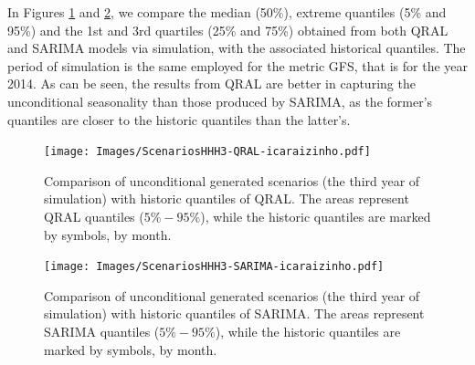 In Figures \ref{fig:scenarios-qral} and \ref{fig:scenarios-sarima}, we compare the median (50\%), extreme quantiles (5\% and 95\%) and the 1st and 3rd quartiles (25\% and 75\%) obtained from  both QRAL and SARIMA models via simulation, with the associated historical quantiles. The period of simulation is the same employed for the metric GFS, that is for the year 2014. As can be seen, the results from QRAL are better in capturing the unconditional seasonality than those produced by SARIMA, as the former's quantiles are closer to the historic quantiles than the latter's.


\begin{figure}[ht]
	\centering
	\texttt{[image: Images/ScenariosHHH3-QRAL-icaraizinho.pdf]}
	\caption{Comparison of unconditional generated scenarios (the third year of simulation) with historic quantiles of QRAL.  The areas represent QRAL quantiles ($5\%-95\%$),
	while the historic quantiles are marked by symbols, by month. }
	\label{fig:scenarios-qral}
\end{figure}

\begin{figure}[h]
	\centering
	\texttt{[image: Images/ScenariosHHH3-SARIMA-icaraizinho.pdf]}
	\caption{Comparison of unconditional generated scenarios (the third year of simulation) with historic quantiles of SARIMA. The areas represent SARIMA quantiles ($5\%-95\%$),
	while the historic quantiles are marked by symbols, by month. }
	\label{fig:scenarios-sarima}
\end{figure}
